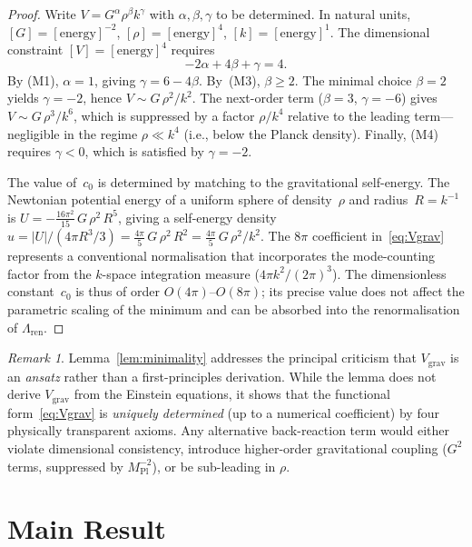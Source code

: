 \documentclass[12pt,a4paper]{article}
\theoremstyle{definition}
\theoremstyle{plain}
\theoremstyle{remark}
\newtheorem{remark}[definition]{Remark}
\begin{document}
\begin{proof}
Write $V = G^\alpha \rho^\beta k^\gamma$ with $\alpha, \beta, \gamma$ to be determined. In natural units, $[G] = [\mathrm{energy}]^{-2}$, $[\rho] = [\mathrm{energy}]^4$, $[k] = [\mathrm{energy}]^1$. The dimensional constraint $[V] = [\mathrm{energy}]^4$ requires
\[
-2\alpha + 4\beta + \gamma = 4.
\]
By (M1), $\alpha = 1$, giving $\gamma = 6 - 4\beta$. By~(M3), $\beta \ge 2$. The minimal choice $\beta = 2$ yields $\gamma = -2$, hence $V \sim G\,\rho^2 / k^2$. The next-order term ($\beta = 3$, $\gamma = -6$) gives $V \sim G\,\rho^3 / k^6$, which is suppressed by a factor $\rho / k^4$ relative to the leading term---negligible in the regime $\rho \ll k^4$ (i.e., below the Planck density). Finally, (M4) requires $\gamma < 0$, which is satisfied by $\gamma = -2$.

The value of~$c_0$ is determined by matching to the gravitational
self-energy.  The Newtonian potential energy of a uniform sphere of
density~$\rho$ and radius~$R = k^{-1}$ is
$U = -\frac{16\pi^2}{15}\,G\,\rho^2\,R^5$, giving a self-energy
density $u = |U|/(4\pi R^3/3) = \frac{4\pi}{5}\,G\,\rho^2\,R^2
= \frac{4\pi}{5}\,G\,\rho^2/k^2$.  The $8\pi$ coefficient
in~\eqref{eq:Vgrav} represents a conventional normalisation that
incorporates the mode-counting factor from the $k$-space integration
measure ($4\pi k^2/(2\pi)^3$).  The dimensionless constant~$c_0$ is
thus of order $O(4\pi)$--$O(8\pi)$; its precise value does not
affect the parametric scaling of the minimum and can be absorbed into
the renormalisation of $\Lambda_{\mathrm{ren}}$.
\end{proof}

\begin{remark}
Lemma~\ref{lem:minimality} addresses the principal criticism that $V_{\mathrm{grav}}$ is an \emph{ansatz} rather than a first-principles derivation. While the lemma does not derive $V_{\mathrm{grav}}$ from the Einstein equations, it shows that the functional form~\eqref{eq:Vgrav} is \emph{uniquely determined} (up to a numerical coefficient) by four physically transparent axioms. Any alternative back-reaction term would either violate dimensional consistency, introduce higher-order gravitational coupling ($G^2$ terms, suppressed by $M_{\mathrm{Pl}}^{-2}$), or be sub-leading in $\rho$.
\end{remark}

\section{Main Result}\label{sec:main}
\end{document}

